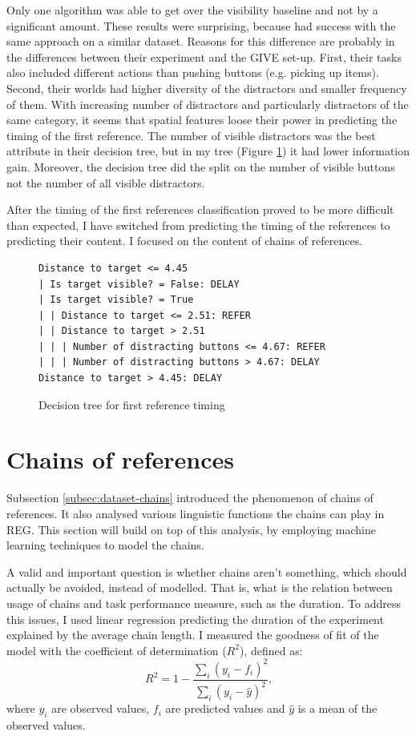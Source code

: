 Only one algorithm was able to get over the visibility baseline and not by a significant amount. These results were surprising, because \citet{stoia2006sentence} had success with the same approach on a similar dataset. Reasons for this difference are probably in the differences between their experiment and the GIVE set-up. First, their tasks also included different actions than pushing buttons (e.g. picking up items). Second, their worlds had higher diversity of the distractors and smaller frequency of them. With increasing number of distractors and particularly distractors of the same category, it seems that spatial features loose their power in predicting the timing of the first reference. The number of visible distractors was the best attribute in their decision tree, but in my tree (Figure \ref{fig:dectree}) it had lower information gain. Moreover, the decision tree did the split on the number of visible buttons not the number of all visible distractors.

After the timing of the first references classification proved to be more difficult than expected, I have switched from predicting the timing of the references to predicting their content. I focused on the content of chains of references.

\begin{figure}[!htbp]
 \centering
\small
\begin{verbatim}
Distance to target <= 4.45
| Is target visible? = False: DELAY
| Is target visible? = True
| | Distance to target <= 2.51: REFER
| | Distance to target > 2.51
| | | Number of distracting buttons <= 4.67: REFER
| | | Number of distracting buttons > 4.67: DELAY
Distance to target > 4.45: DELAY
\end{verbatim}
\caption{Decision tree for first reference timing}
\label{fig:dectree}
\end{figure}

\section{Chains of references}
Subsection \ref{subsec:dataset-chains} introduced the phenomenon of chains of references. It also analysed various linguistic functions the chains can play in REG. This section will build on top of this analysis, by employing machine learning techniques to model the chains.

A valid and important question is whether chains aren't something, which should actually be avoided, instead of modelled. That is, what is the relation between usage of chains and task performance measure, such as the duration. To address this issues, I used linear regression predicting the duration of the experiment explained by the average chain length. I measured the goodness of fit of the model with the coefficient of determination ($R^2$), defined as:
\begin{equation*} 
R^2 = 1 - \frac{\sum_i (y_i - f_i)^2}{\sum_i (y_i - \hat{y})^2}\text{,}
\end{equation*}
where $y_i$ are observed values, $f_i$ are predicted values and $\hat{y}$ is a mean of the observed values.


